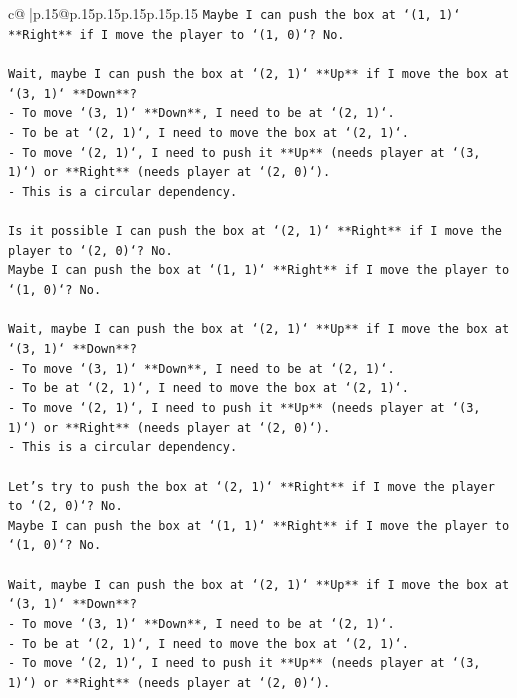 \documentclass{article}
\begin{document}
{\begin{supertabular}{c@{$\;$}|p{.15\linewidth}@{}p{.15\linewidth}p{.15\linewidth}p{.15\linewidth}p{.15\linewidth}p{.15\linewidth}}
{{{\texttt{Maybe I can push the box at `(1, 1)` **Right** if I move the player to `(1, 0)`? No.} \\
\\ 
\texttt{Wait, maybe I can push the box at `(2, 1)` **Up** if I move the box at `(3, 1)` **Down**?} \\
\texttt{{-} To move `(3, 1)` **Down**, I need to be at `(2, 1)`.} \\
\texttt{{-} To be at `(2, 1)`, I need to move the box at `(2, 1)`.} \\
\texttt{{-} To move `(2, 1)`, I need to push it **Up** (needs player at `(3, 1)`) or **Right** (needs player at `(2, 0)`).} \\
\texttt{{-} This is a circular dependency.} \\
\\ 
\texttt{Is it possible I can push the box at `(2, 1)` **Right** if I move the player to `(2, 0)`? No.} \\
\texttt{Maybe I can push the box at `(1, 1)` **Right** if I move the player to `(1, 0)`? No.} \\
\\ 
\texttt{Wait, maybe I can push the box at `(2, 1)` **Up** if I move the box at `(3, 1)` **Down**?} \\
\texttt{{-} To move `(3, 1)` **Down**, I need to be at `(2, 1)`.} \\
\texttt{{-} To be at `(2, 1)`, I need to move the box at `(2, 1)`.} \\
\texttt{{-} To move `(2, 1)`, I need to push it **Up** (needs player at `(3, 1)`) or **Right** (needs player at `(2, 0)`).} \\
\texttt{{-} This is a circular dependency.} \\
\\ 
\texttt{Let's try to push the box at `(2, 1)` **Right** if I move the player to `(2, 0)`? No.} \\
\texttt{Maybe I can push the box at `(1, 1)` **Right** if I move the player to `(1, 0)`? No.} \\
\\ 
\texttt{Wait, maybe I can push the box at `(2, 1)` **Up** if I move the box at `(3, 1)` **Down**?} \\
\texttt{{-} To move `(3, 1)` **Down**, I need to be at `(2, 1)`.} \\
\texttt{{-} To be at `(2, 1)`, I need to move the box at `(2, 1)`.} \\
\texttt{{-} To move `(2, 1)`, I need to push it **Up** (needs player at `(3, 1)`) or **Right** (needs player at `(2, 0)`).} \\
}}}
\end{supertabular}}
\end{document}
